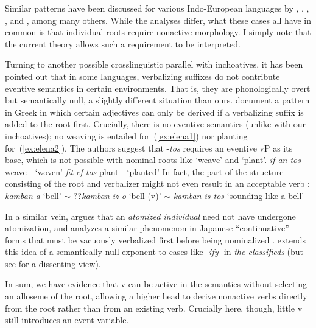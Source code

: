 Similar patterns have been discussed for various Indo-European languages by \cite{aronoff94}, \cite{embick04}, \cite{kallulli13}, \cite{wood15springer}, \cite{kastnerzu17} and \cite{grestenberger18}, among many others. While the analyses differ, what these cases all have in common is that individual roots require nonactive morphology. I simply note that the current theory allows such a requirement to be interpreted.

Turning to another possible crosslinguistic parallel with inchoatives, it has been pointed out that in some languages, verbalizing suffixes do not contribute eventive semantics in certain environments. That is, they are phonologically overt but semantically null, a slightly different situation than ours. \citet{elenasamioti13,elenasamioti14} document a pattern in Greek in which certain adjectives can only be derived if a verbalizing suffix is added to the root first. Crucially, there is no eventive semantics (unlike with our inchoatives); no weaving is entailed for~(\ref{ex:elena1}) nor planting for~(\ref{ex:elena2}). {The authors suggest that -\emph{tos} requires an eventive vP as its base, which is not possible with nominal roots like `weave' and `plant'.}
\ex \label{ex:elena1} \emph{if-an-tos} weave-- `woven'
\xe
\ex \label{ex:elena2} \emph{fit-ef-tos} plant-- `planted' \hfill \citep[97]{elenasamioti14}
\xe
In fact, the part of the structure consisting of the root and verbalizer might not even result in an acceptable verb \citep[100]{elenasamioti14}:
\ex \emph{kamban-a} `bell' $\sim$ ??\emph{kamban-iz-o} `bell (v)' $\sim$ \emph{kamban-is-tos} `sounding like a bell'
\xe

In a similar vein, \cite{marantz13} argues that an \emph{atomized individual} need not have undergone atomization, and analyzes a similar phenomenon in Japanese ``continuative'' forms that must be vacuously verbalized first{ before being nominalized} \citep{volpe05}. \cite{anagnostopoulou14thli} extends this idea of a semantically null exponent to cases like -\emph{ify}- in \emph{the class\underline{ifie}ds} (but see \citealt{borer14lingua} for a dissenting view).

In sum, we have evidence that v can be active in the semantics without selecting an alloseme of the root, allowing a higher {\vz} head to derive nonactive verbs directly from the root rather than from an existing verb. Crucially here, though, little v still introduces an event variable.

